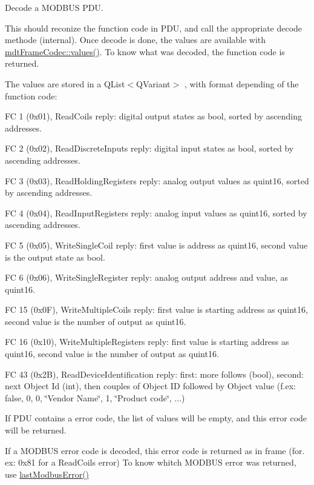Decode a MODBUS PDU. 

This should reconize the function code in PDU, and call the appropriate decode methode (internal). Once decode is done, the values are available with \hyperlink{classmdt_frame_codec_a2c0cc0f9d9b72ef2295b7ec7eca72ea7}{mdtFrameCodec::values()}. To know what was decoded, the function code is returned.

The values are stored in a QList$<$QVariant$>$ , with format depending of the function code:
\begin{DoxyItemize}
\item FC 1 (0x01), ReadCoils reply: digital output states as bool, sorted by ascending addresses.
\item FC 2 (0x02), ReadDiscreteInputs reply: digital input states as bool, sorted by ascending addresses.
\item FC 3 (0x03), ReadHoldingRegisters reply: analog output values as quint16, sorted by ascending addresses.
\item FC 4 (0x04), ReadInputRegisters reply: analog input values as quint16, sorted by ascending addresses.
\item FC 5 (0x05), WriteSingleCoil reply: first value is address as quint16, second value is the output state as bool.
\item FC 6 (0x06), WriteSingleRegister reply: analog output address and value, as quint16.
\item FC 15 (0x0F), WriteMultipleCoils reply: first value is starting address as quint16, second value is the number of output as quint16.
\item FC 16 (0x10), WriteMultipleRegisters reply: first value is starting address as quint16, second value is the number of output as quint16.
\item FC 43 (0x2B), ReadDeviceIdentification reply: first: more follows (bool), second: next Object Id (int), then couples of Object ID followed by Object value (f.ex: false, 0, 0, \char`\"{}Vendor Name\char`\"{}, 1, \char`\"{}Product code\char`\"{}, ...)
\end{DoxyItemize}

If PDU contains a error code, the list of values will be empty, and this error code will be returned.

If a MODBUS error code is decoded, this error code is returned as in frame (for. ex: 0x81 for a ReadCoils error) To know whitch MODBUS error was returned, use \hyperlink{classmdt_frame_codec_modbus_a21f3102e12f1a1d9c4145c1ce1f8e6b6}{lastModbusError()}


